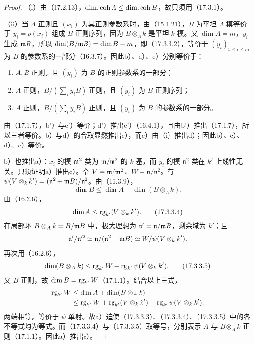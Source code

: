 \begin{proof}
（i）由（17.2.13），$\operatorname{dim.coh} A\leq\operatorname{dim.coh} B$，故只须用（17.3.1）。

（ii）当 $A$ 正则且 $(x_i)$ 为其正则参数系时，由（15.1.21），$B$ 为平坦 $A$-模等价于 $y_i=\rho(x_i)$ 组成 $B$-正则序列，因为 $B\otimes_A k$ 是平坦 $k$-模。又 $\dim A=m$，$y_i$ 生成 $\mathfrak m B$，所以
$\dim(B/\mathfrak m B)=\dim B-m$，即（17.3.3.2），等价于 $(y_i)_{1\leq i\leq m}$ 为 $B$ 的参数系的一部分（16.3.7）。因此b）、d）、e）分别等价于：
\begin{enumerate}
 \item[b')] $A,B$ 正则，且 $(y_i)$ 为 $B$ 的正则参数系的一部分；
 \item[d')] $A$ 正则，$B/(\sum_i y_iB)$ 正则，且 $(y_i)$ 为 $B$-正则序列；
 \item[e')] $A$ 正则，$B/(\sum_i y_iB)$ 正则，且 $(y_i)$ 为 $B$ 的参数系的一部分。
\end{enumerate}
由（17.1.7），b'）与e'）等价；d'）推出e'）（16.4.1），且由b'）推出（17.1.7），所以三者等价。b）与d）的合取显然推出c），而c）由（i）推出d）；因此b）、c）、d）、e）等价。

b）也推出a）：$x_i$ 的模 $\mathfrak m^2$ 类为 $\mathfrak m/\mathfrak m^2$ 的 $k$-基，而 $y_i$ 的模 $\mathfrak n^2$ 类在 $k'$ 上线性无关。只须证明a）推出e）。令
$V=\mathfrak m/\mathfrak m^2$、$W=\mathfrak n/\mathfrak n^2$。有
$\psi(V\otimes_k k')=(\mathfrak n^2+\mathfrak m B)/\mathfrak n^2$。由（16.3.9），
\begin{equation}
 \dim B\leq\dim A+\dim(B\otimes_A k).
 \tag{17.3.3.3}
\end{equation}
由（16.2.6），
\begin{equation}
 \dim A\leq\operatorname{rg}_{k'}(V\otimes_k k').
 \tag{17.3.3.4}
\end{equation}
在局部环 $B\otimes_A k=B/\mathfrak m B$ 中，极大理想为
$\mathfrak n'=\mathfrak n/\mathfrak m B$，剩余域为 $k'$；且
\[
 \mathfrak n'/\mathfrak n'^2
 \simeq\mathfrak n/(\mathfrak n^2+\mathfrak m B)
 \simeq W/\psi(V\otimes_k k').
\]
再次用（16.2.6），
\begin{equation}
 \dim(B\otimes_A k)\leq\operatorname{rg}_{k'}W-\operatorname{rg}_{k'}\psi(V\otimes_k k').
 \tag{17.3.3.5}
\end{equation}
又 $B$ 正则，故 $\dim B=\operatorname{rg}_{k'}W$（17.1.1）。结合以上三式，
\[
 \begin{aligned}
 \operatorname{rg}_{k'}W
 &\leq\dim A+\dim(B\otimes_A k)\\
 &\leq\operatorname{rg}_{k'}W+\operatorname{rg}_{k'}(V\otimes_k k')
       -\operatorname{rg}_{k'}\psi(V\otimes_k k').
 \end{aligned}
\]
两端相等，等价于 $\psi$ 单射。故a）迫使（17.3.3.3）、（17.3.3.4）、（17.3.3.5）中的各不等式均为等式。而（17.3.3.4）与（17.3.3.5）取等号，分别表示 $A$ 与 $B\otimes_A k$ 正则（17.1.1）。因此a）推出e）。
\end{proof}

